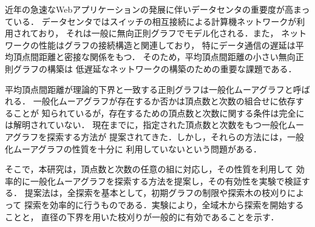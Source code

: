 
近年の急速なWebアプリケーションの発展に伴いデータセンタの重要度が高まっている．
データセンタではスイッチの相互接続による計算機ネットワークが利用されており，
それは一般に無向正則グラフでモデル化される．また，
ネットワークの性能はグラフの接続構造と関連しており，
特にデータ通信の遅延は平均頂点間距離と密接な関係をもつ．
そのため，平均頂点間距離の小さい無向正則グラフの構築は
低遅延なネットワークの構築のための重要な課題である．

平均頂点間距離が理論的下界と一致する正則グラフは一般化ムーアグラフと呼ばれる．
一般化ムーアグラフが存在するか否かは頂点数と次数の組合せに依存することが
知られているが，存在するための頂点数と次数に関する条件は完全には解明されていない．
現在までに，指定された頂点数と次数をもつ一般化ムーアグラフを探索する方法が
提案されてきた．しかし，それらの方法には，一般化ムーアグラフの性質を十分に
利用していないという問題がある．

そこで，本研究は，頂点数と次数の任意の組に対応し，その性質を利用して
効率的に一般化ムーアグラフを探索する方法を提案し，その有効性を実験で検証する．
提案法は，全探索を基本として，初期グラフの制限や探索木の枝刈りによって
探索を効率的に行うものである．実験により，全域木から探索を開始することと，
直径の下界を用いた枝刈りが一般的に有効であることを示す．

